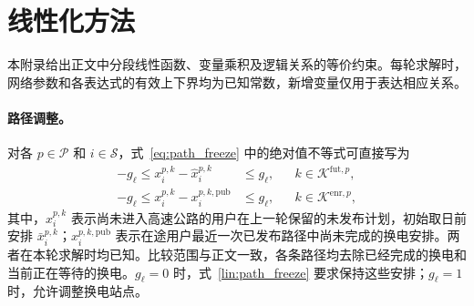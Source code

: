 \section{线性化方法}
\label{lin:appendix}

本附录给出正文中分段线性函数、变量乘积及逻辑关系的等价约束。每轮求解时，网络参数和各表达式的有效上下界均为已知常数，新增变量仅用于表达相应关系。

\paragraph{路径调整。}
对各 $p\in\mathcal P$ 和 $i\in\mathcal S$，式~\eqref{eq:path_freeze} 中的绝对值不等式可直接写为
\begin{equation}
\begin{aligned}
-g_\ell\le x_i^{p,k}-\widehat{x}_i^{p,k}&\le g_\ell,
&&k\in\mathcal K^{\mathrm{fut},p},\\
-g_\ell\le x_i^{p,k}-x_i^{p,k,\mathrm{pub}}&\le g_\ell,
&&k\in\mathcal K^{\mathrm{enr},p},
\end{aligned}
\label{lin:path_freeze}
\end{equation}
其中，$\widehat{x}_i^{p,k}$ 表示尚未进入高速公路的用户在上一轮保留的未发布计划，初始取日前安排 $\bar x_i^{p,k}$；$x_i^{p,k,\mathrm{pub}}$ 表示在途用户最近一次已发布路径中尚未完成的换电安排。两者在本轮求解时均已知。比较范围与正文一致，各条路径均去除已经完成的换电和当前正在等待的换电。$g_\ell=0$ 时，式~\eqref{lin:path_freeze} 要求保持这些安排；$g_\ell=1$ 时，允许调整换电站点。

